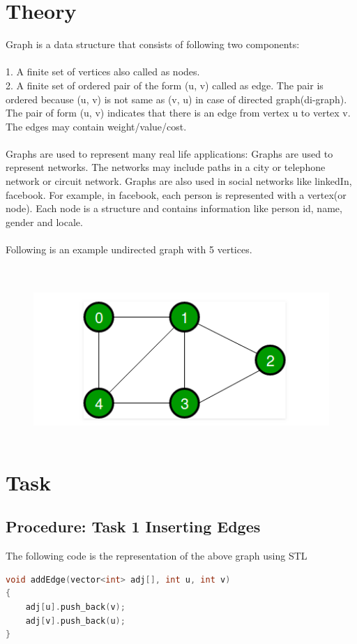 \documentclass[11pt]{article}            %
\begin{document}
\section{Theory }              
\justify Graph is a data structure that consists of following two components:\\~\\
1. A finite set of vertices also called as nodes.\\
2. A finite set of ordered pair of the form (u, v) called as edge. The pair is ordered because (u, v) is not same as (v, u) in case of directed graph(di-graph). The pair of form (u, v) indicates that there is an edge from vertex u to vertex v. The edges may contain weight/value/cost.\\~\\
Graphs are used to represent many real life applications: Graphs are used to represent networks. The networks may include paths in a city or telephone network or circuit network. Graphs are also used in social networks like linkedIn, facebook. For example, in facebook, each person is represented with a vertex(or node). Each node is a structure and contains information like person id, name, gender and locale.\\~\\
Following is an example undirected graph with 5 vertices.\\~\\
\begin{figure}[H]
\centering
  \includegraphics[width=12cm,height=6cm,keepaspectratio]{5.png}    
\end{figure}
\section{Task}  
\subsection{Procedure: Task 1 Inserting Edges}
The following code is the representation of the above graph using STL
\begin{lstlisting}[language=C++]
void addEdge(vector<int> adj[], int u, int v)
{
	adj[u].push_back(v);
	adj[v].push_back(u);
}
\end{lstlisting}
\end{document}
